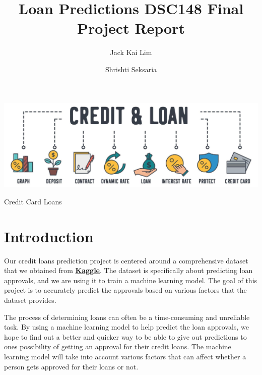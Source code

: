 \documentclass[sigplan]{acmart}
\title{Loan Predictions DSC148 Final Project Report}
\begin{document}
\author{Jack Kai Lim}

\author{Shrishti Seksaria}


\begin{teaserfigure}
    \includegraphics[width=\textwidth]{images/card banner.jpg}
    \caption{Credit Card Loans}
    \label{fig:teaser}
\end{teaserfigure}



\maketitle


\section{Introduction}
\label{sec:intro}
Our credit loans prediction project is centered around a comprehensive dataset that we obtained from \href{https://www.kaggle.com/datasets/hemanthsai7/loandefault}{\textbf{Kaggle}}. The dataset is specifically about predicting loan approvals, and we are using it to train a machine learning model. The goal of this project is to accurately predict the approvals based on various factors that the dataset provides.

The process of determining loans can often be a time-consuming and unreliable task. By using a machine learning model to help predict the loan approvals, we hope to find out a better and quicker way to be able to give out predictions to ones possibility of getting an approval for their credit loans. The machine learning model will take into account various factors that can affect whether a person gets approved for their loans or not.
\end{document}

